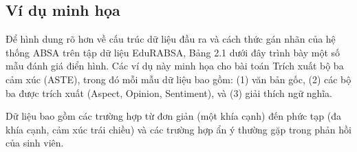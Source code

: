\documentclass[12pt,a4paper]{report}
\begin{document}
\subsection{Ví dụ minh họa}
Để hình dung rõ hơn về cấu trúc dữ liệu đầu ra và cách thức gán nhãn của hệ thống ABSA trên tập dữ liệu EduRABSA, Bảng 2.1 dưới đây trình bày một số mẫu đánh giá điển hình. Các ví dụ này minh họa cho bài toán Trích xuất bộ ba cảm xúc (ASTE), trong đó mỗi mẫu dữ liệu bao gồm: (1) văn bản gốc, (2) các bộ ba được trích xuất (Aspect, Opinion, Sentiment), và (3) giải thích ngữ nghĩa.

Dữ liệu bao gồm các trường hợp từ đơn giản (một khía cạnh) đến phức tạp (đa khía cạnh, cảm xúc trái chiều) và các trường hợp ẩn ý thường gặp trong phản hồi của sinh viên.
\end{document}
